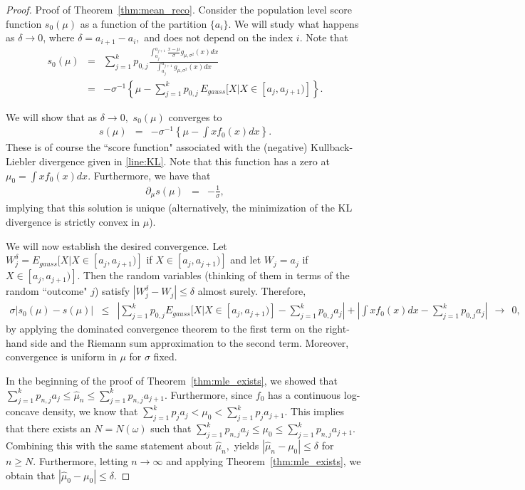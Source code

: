 \documentclass[12pt]{article} %
\begin{document}
\noindent\begin{proof}{Proof of Theorem~\ref{thm:mean_reco}.}
Consider the population level score function $s_0(\mu)$ as a function of the partition $\{a_i\}.$   We will study what happens as $\delta\rightarrow 0$, where $\delta=a_{i+1}-a_i,$ and does not depend on the index $i.$  Note that
\begin{eqnarray*}
s_0(\mu) &=&  \sum_{j=1}^k p_{0,j} \frac{\int_{a_j}^{a_{j+1}}  \frac{x-\mu}{\sigma} g_{\mu, \sigma^2}(x)dx}{\int_{a_j}^{a_{j+1}}  g_{\mu, \sigma^2}(x)dx} \\
&=&- \sigma^{-1} \left\{\mu - \sum_{j=1}^k p_{0,j} \, E_{gauss}[X|X\in[a_j, a_{j+1})] \right\}.
\end{eqnarray*}

We will show that as $\delta \rightarrow 0,$ $s_0(\mu)$ converges to 
\begin{eqnarray*}
s(\mu) &=&  - \sigma^{-1} \left\{\mu - \int x f_0(x)dx \right\}.
\end{eqnarray*}
These is of course the ``score function" associated with the (negative) Kullback-Liebler divergence given in \eqref{line:KL}.  Note that this function has  a zero at $\mu_0=\int x f_0(x)dx.$ Furthermore, we have that 
\begin{eqnarray*}
\partial_\mu s (\mu) &=& -\frac{1}{\sigma},
\end{eqnarray*}
implying that this solution is unique (alternatively, the minimization of the KL divergence is strictly convex in $\mu$). 

We will now establish the desired convergence.   Let $W_{j}^\delta=E_{gauss}[X|X\in[a_j, a_{j+1})]$ if $X\in [a_j, a_{j+1})]$ and let $W_{j}=a_j$ if $X\in [a_j, a_{j+1})].$   Then the random variables (thinking of them in terms of the random ``outcome" $j$) satisfy $|W_{j}^\delta-W_{j}|\leq \delta$ almost surely.   Therefore, 
\begin{eqnarray*}
\sigma \left \vert s_0(\mu)-s(\mu)\right \vert &\leq & \left \vert \sum_{j=1}^k p_{0,j} E_{gauss}[X|X\in[a_j, a_{j+1})] -\sum_{j=1}^k p_{0,j} a_j \right \vert + \left \vert \int x f_0(x)dx -\sum_{j=1}^k p_{0,j} a_j\right \vert \ \ \rightarrow \ \ 0,
\end{eqnarray*}
by applying the dominated convergence theorem to the first term on the right-hand side and the Riemann sum approximation to the second term. Moreover, convergence is uniform in $\mu$ for $\sigma$ fixed.  

In the beginning of the proof of Theorem~\ref{thm:mle_exists}, we showed that $\sum_{j=1}^k p_{n,j}a_{j} \leq \widehat \mu_n \leq \sum_{j=1}^k p_{n,j}a_{j+1}.$   Furthermore, since $f_0$ has a continuous log-concave density, we know that $\sum_{j=1}^k p_{j}a_{j} < \mu_0 < \sum_{j=1}^k p_{j}a_{j+1}.$    This implies that there exists an $N=N(\omega)$ such that $\sum_{j=1}^k p_{n,j}a_{j} \leq \mu_0 \leq \sum_{j=1}^k p_{n,j}a_{j+1}.$  Combining this with the same statement about $\widehat \mu_n,$ yields $|\widehat \mu_n - \mu_0| \leq \delta$ for $n\geq N.$  Furthermore, letting $n\rightarrow\infty$ and applying Theorem~\ref{thm:mle_exists}, we obtain that $|\widehat \mu_0 - \mu_0| \leq \delta$.


\end{proof}
\end{document}
